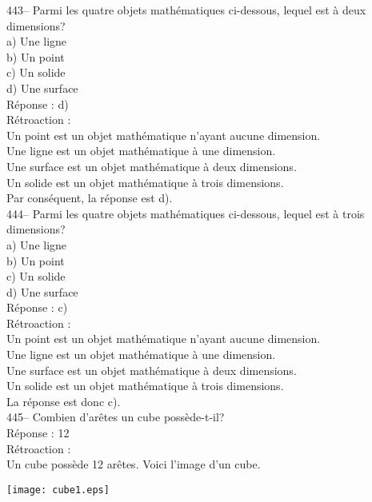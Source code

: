 ﻿\documentclass[letterpaper, 12pt]{article}
\begin{document}
443-- Parmi les quatre objets math\'ematiques ci-dessous, lequel est \`a
deux dimensions?\\
a) Une ligne\\
b) Un point\\
c) Un solide\\
d) Une surface\\

R\'eponse : d)\\

R\'etroaction : \\
Un point est un objet math\'ematique n'ayant aucune dimension.\\
Une ligne est un objet math\'ematique \`a une dimension.\\
Une surface est un objet math\'ematique \`a deux dimensions.\\
Un solide est un objet math\'ematique \`a trois dimensions.\\
Par cons\'equent, la r\'eponse est d).\\

444-- Parmi les quatre objets math\'ematiques ci-dessous, lequel est \`a
trois dimensions?\\
a) Une ligne\\
b) Un point\\
c) Un solide\\
d) Une surface\\

R\'eponse : c)\\

R\'etroaction : \\
Un point est un objet math\'ematique n'ayant aucune dimension.\\
Une ligne est un objet math\'ematique \`a une dimension.\\
Une surface est un objet math\'ematique \`a deux dimensions.\\
Un solide est un objet math\'ematique \`a trois dimensions.\\
La r\'eponse est donc c).\\

445-- Combien d'ar\^etes un cube poss\`ede-t-il?\\

R\'eponse : 12\\

R\'etroaction : \\
Un cube poss\`ede 12 ar\^etes. Voici l'image d'un cube.\\
    \begin{center}
    \texttt{[image: cube1.eps]}
    \end{center}
\end{document}
